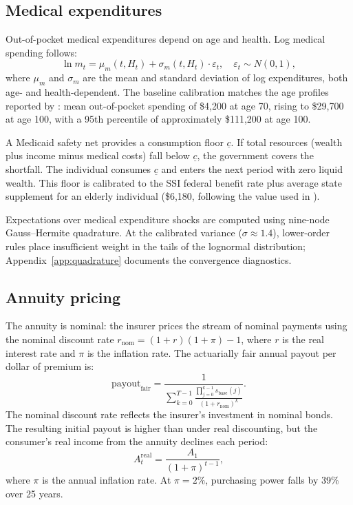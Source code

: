 \documentclass[12pt]{article}
\begin{document}
\subsection{Medical expenditures}

Out-of-pocket medical expenditures depend on age and health. Log medical spending follows:
\begin{equation}
\label{eq:medical}
\ln m_{t} = \mu_m(t, H_t) + \sigma_m(t, H_t) \cdot \varepsilon_t, \quad \varepsilon_t \sim N(0, 1),
\end{equation}
where $\mu_m$ and $\sigma_m$ are the mean and standard deviation of log expenditures, both age- and health-dependent. The baseline calibration matches the age profiles reported by \citet{jones2018}: mean out-of-pocket spending of \$4,200 at age 70, rising to \$29,700 at age 100, with a 95th percentile of approximately \$111,200 at age 100.

A Medicaid safety net provides a consumption floor $\underline{c}$. If total resources (wealth plus income minus medical costs) fall below $\underline{c}$, the government covers the shortfall. The individual consumes $\underline{c}$ and enters the next period with zero liquid wealth. This floor is calibrated to the SSI federal benefit rate plus average state supplement for an elderly individual (\$6,180, following the value used in \citealp{lockwood2012}).

Expectations over medical expenditure shocks are computed using nine-node Gauss--Hermite quadrature. At the calibrated variance ($\sigma \approx 1.4$), lower-order rules place insufficient weight in the tails of the lognormal distribution; Appendix~\ref{app:quadrature} documents the convergence diagnostics.

\subsection{Annuity pricing}

The annuity is nominal: the insurer prices the stream of nominal payments using the nominal discount rate $r_{\text{nom}} = (1+r)(1+\pi) - 1$, where $r$ is the real interest rate and $\pi$ is the inflation rate. The actuarially fair annual payout per dollar of premium is:
\begin{equation}
\text{payout}_{\text{fair}} = \frac{1}{\sum_{k=0}^{T-1} \frac{\prod_{j=0}^{k-1} s_{\text{base}}(j)}{(1+r_{\text{nom}})^k}}.
\end{equation}
The nominal discount rate reflects the insurer's investment in nominal bonds. The resulting initial payout is higher than under real discounting, but the consumer's real income from the annuity declines each period:
\begin{equation}
A_t^{\text{real}} = \frac{A_1}{(1 + \pi)^{t-1}},
\end{equation}
where $\pi$ is the annual inflation rate. At $\pi = 2\%$, purchasing power falls by 39\% over 25 years.
\end{document}
